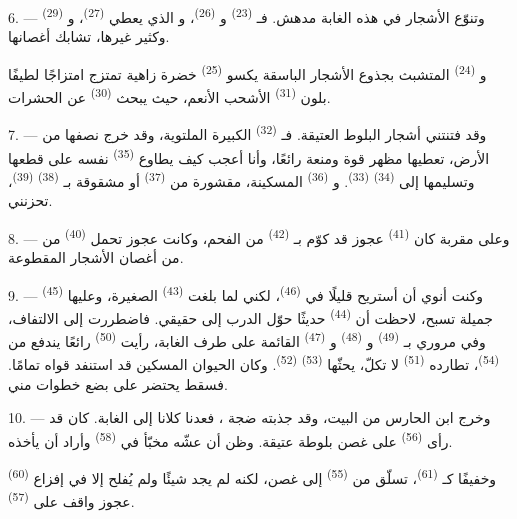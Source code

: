 6. --- وتنوّع الأشجار في هذه الغابة مدهش. فـ \textsuperscript{(23)}
و \textsuperscript{(26)}، و الذي يعطي
 \textsuperscript{(27)}، و \textsuperscript{(29)} وكثير
غيرها، تشابك أغصانها.

و \textsuperscript{(24)} المتشبث بجذوع الأشجار الباسقة يكسو
 \textsuperscript{(25)} خضرة زاهية تمتزج امتزاجًا لطيفًا
بلون  \textsuperscript{(31)} الأشحب الأنعم، حيث يبحث
 \textsuperscript{(30)} عن الحشرات.

\VUsaut{3.0mm}
\VUsaut{3.0mm}

7. --- وقد فتنتني أشجار البلوط العتيقة. فـ \textsuperscript{(32)}
الكبيرة الملتوية، وقد خرج نصفها من الأرض، تعطيها مظهر قوة ومنعة رائعًا،
وأنا أعجب كيف يطاوع  \textsuperscript{(35)} نفسه على قطعها
وتسليمها إلى  \textsuperscript{(34)} 
\textsuperscript{(33)}. و \textsuperscript{(36)} المسكينة، مقشورة من
 \textsuperscript{(37)} أو مشقوقة بـ \textsuperscript{(38)}
 \textsuperscript{(39)}، تحزنني.

8. --- وعلى مقربة كان  \textsuperscript{(41)} عجوز قد كوّم
بـ  \textsuperscript{(42)} من الفحم، وكانت عجوز
تحمل  \textsuperscript{(40)} من  من أغصان
الأشجار المقطوعة.

\VUsaut{3.0mm}
\VUsaut{3.0mm}

9. --- وكنت أنوي أن أستريح قليلًا في 
\textsuperscript{(46)}، لكني لما بلغت  \textsuperscript{(43)} الصغيرة،
وعليها  \textsuperscript{(45)} جميلة تسبح، لاحظت أن 
\textsuperscript{(44)} حديثًا حوّل الدرب إلى  حقيقي. فاضطررت إلى
الالتفاف، وفي مروري بـ \textsuperscript{(49)} و
\textsuperscript{(48)} و \textsuperscript{(47)} القائمة على طرف
الغابة، رأيت  \textsuperscript{(50)} رائعًا يندفع من
 \textsuperscript{(54)}، تطارده  \textsuperscript{(51)}
لا تكلّ، يحثّها  \textsuperscript{(53)} 
\textsuperscript{(52)}. وكان الحيوان المسكين قد استنفد قواه تمامًا. فسقط يحتضر
على بضع خطوات مني.

10. --- وخرج ابن الحارس من البيت، وقد جذبته ضجة ، فعدنا
كلانا إلى الغابة. كان قد رأى  \textsuperscript{(56)} على غصن
بلوطة عتيقة. وظن أن عشّه مخبّأ في  \textsuperscript{(58)} وأراد
أن يأخذه.

وخفيفًا كـ \textsuperscript{(61)}، تسلّق من 
\textsuperscript{(55)} إلى غصن، لكنه لم يجد شيئًا ولم يُفلح إلا في إفزاع
 \textsuperscript{(60)} عجوز واقف على  \textsuperscript{(57)}.
\VUsaut{4.0mm}
\VUfilet{22mm}
